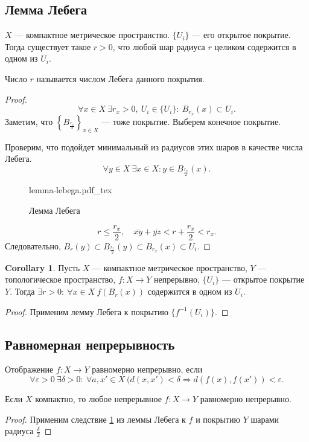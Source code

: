 \documentclass[11pt]{book}
\newcommand{\incfig}[1]{%
    \def\svgwidth{\columnwidth}
    {#1.pdf_tex}
}
\renewcommand{\le}{\leqslant}
\theoremstyle{definition}
\theoremstyle{plain}
\theoremstyle{plain}
\theoremstyle{definition}
\newtheorem*{cor}{Corollary}
\theoremstyle{remark}
\begin{document}
\subsection{Лемма Лебега}
\begin{thm}
    $ X$ --- компактное метрическое пространство.  $ \{U_i\}$ --- его открытое покрытие. 
    Тогда существует такое $ r>0$, что любой шар радиуса $ r$ целиком содержится в одном из  $ U_i$. 
    \begin{defn}
        Число $ r$ называется числом Лебега данного покрытия.
    \end{defn}
\end{thm}
\begin{proof}
    \[
	\forall x \in X ~ \exists r_x >0, ~ U_i \in  \{U_i\}: ~ B_{r_x}(x) \subset U_i
    .\] 
    Заметим, что $ \left\{B_{\frac{r_x}{2}}\right\}_{x \in X}$ --- тоже покрытие. Выберем конечное покрытие. 

    Проверим, что подойдет минимальный из радиусов этих шаров в качестве числа Лебега.
    \[
	\forall y \in X ~\exists x \in X: y \in B_{\frac{r_x}{2}}(x)
    .\] 
\begin{figure}[ht]
    \centering
    \incfig{lemma-lebega}
    \caption{Лемма Лебега}
    \label{fig:lemma-lebega}
\end{figure}
\[
    r \le  \frac{r_x}{2}, \quad \overline{xy} + \overline{yz} < r + \frac{r_x}{2} <  r_x
.\] 
Следовательно, $ B_r (y) \subset B_{\frac{r_x}{2}}(y) \subset B_{r_x}(x) \subset U_i$.
\end{proof}
\begin{cor}\label{cor_ll}
    Пусть $ X$ --- компактное метрическое пространство,  $ Y$ ---  топологическое пространство, $ f: X \to  Y$ непрерывно, $ \{U_i\}$ --- открытое покрытие $ Y$.
    Тогда  $ \exists r >0: ~ \forall x \in  X ~ f(B_r(x)) \text{ содержится в одном из } U_i$.
\end{cor}
\begin{proof}
    Применим лемму Лебега к покрытию $ \{f^{-1}(U_i)\}$.
\end{proof}
\subsection{Равномерная непрерывность}
\begin{defn}
    Отображение $ f: X \to  Y$ равномерно непрерывно, если
    \[
	\forall  \varepsilon >0 ~ \exists  \delta > 0: ~ \forall a, x' \in  X ~ (d(x, x') < \delta \Longrightarrow  d(f(x), f(x')) < \varepsilon 
    .\] 
\end{defn}
\begin{thm}
    Если $ X$ компактно, то любое непрерывное  $ f: X \to  Y$ равномерно непрерывно.
\end{thm}
\begin{proof}
    Применим следствие \ref{cor_ll} из леммы Лебега к $ f$ и покрытию  $ Y$ шарами радиуса $ \frac{\delta}{2}$
\end{proof}
\end{document}
